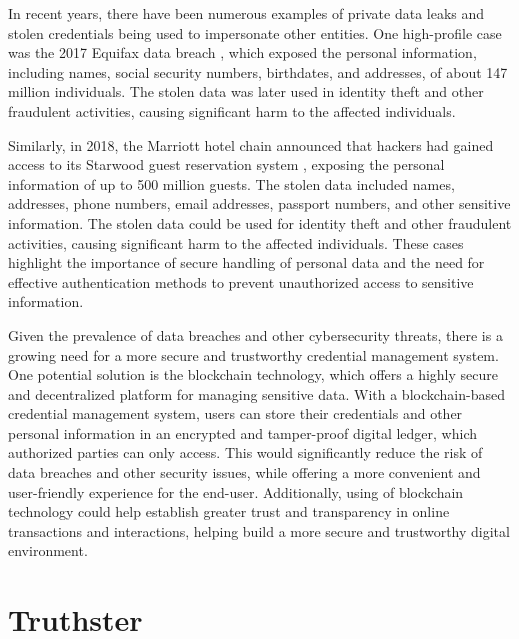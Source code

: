 \documentclass[target=mst,aauheader=]{thud}
\begin{document}
In recent years, there have been numerous examples of private data leaks and stolen credentials being used to impersonate other entities. One high-profile case was the 2017 Equifax data breach \cite{equifaxDataBreachSettlement}, which exposed the personal information, including names, social security numbers, birthdates, and addresses, of about 147 million individuals. The stolen data was later used in identity theft and other fraudulent activities, causing significant harm to the affected individuals.\par
Similarly, in 2018, the Marriott hotel chain announced that hackers had gained access to its Starwood guest reservation system \cite{marriotDataBreach}, exposing the personal information of up to 500 million guests. The stolen data included names, addresses, phone numbers, email addresses, passport numbers, and other sensitive information. The stolen data could be used for identity theft and other fraudulent activities, causing significant harm to the affected individuals. These cases highlight the importance of secure handling of personal data and the need for effective authentication methods to prevent unauthorized access to sensitive information.\par
Given the prevalence of data breaches and other cybersecurity threats, there is a growing need for a more secure and trustworthy credential management system. One potential solution is the blockchain technology, which offers a highly secure and decentralized platform for managing sensitive data. With a blockchain-based credential management system, users can store their credentials and other personal information in an encrypted and tamper-proof digital ledger, which authorized parties can only access. This would significantly reduce the risk of data breaches and other security issues, while offering a more convenient and user-friendly experience for the end-user. Additionally, using of blockchain technology could help establish greater trust and transparency in online transactions and interactions, helping build a more secure and trustworthy digital environment.


\section{Truthster}
\end{document}
